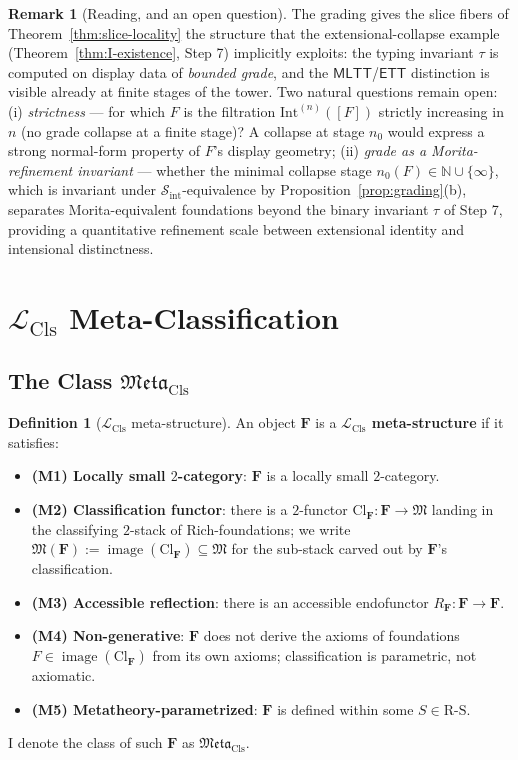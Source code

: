 \documentclass[11pt]{article}
\theoremstyle{plain}
\theoremstyle{definition}
\newtheorem{definition}[theorem]{Definition}
\newtheorem{remark}[theorem]{Remark}
\newcommand{\RS}{\mathrm{R\text{-}S}}
\newcommand{\cS}{\mathcal{S}}
\newcommand{\fM}{\mathfrak{M}}
\newcommand{\Meta}{\mathfrak{Meta}}
\newcommand{\LCls}{\mathcal{L}_{\mathrm{Cls}}}
\newcommand{\Sint}{\cS_{\mathrm{int}}}
\newcommand{\Cl}{\mathrm{Cl}}
\newcommand{\MLTT}{\mathsf{MLTT}}
\newcommand{\ETT}{\mathsf{ETT}}
\DeclareMathOperator{\image}{image}
\begin{document}
\begin{remark}[Reading, and an open question]\label{rem:grading-open}
The grading gives the slice fibers of Theorem~\ref{thm:slice-locality} the structure that the extensional-collapse example (Theorem~\ref{thm:I-existence}, Step 7) implicitly exploits: the typing invariant $\tau$ is computed on display data of \emph{bounded grade}, and the $\MLTT$/$\ETT$ distinction is visible already at finite stages of the tower. Two natural questions remain open: (i) \emph{strictness} --- for which $F$ is the filtration $\mathrm{Int}^{(n)}([F])$ strictly increasing in $n$ (no grade collapse at a finite stage)? A collapse at stage $n_0$ would express a strong normal-form property of $F$'s display geometry; (ii) \emph{grade as a Morita-refinement invariant} --- whether the minimal collapse stage $n_0(F) \in \mathbb{N} \cup \{\infty\}$, which is invariant under $\Sint$-equivalence by Proposition~\ref{prop:grading}(b), separates Morita-equivalent foundations beyond the binary invariant $\tau$ of Step 7, providing a quantitative refinement scale between extensional identity and intensional distinctness.
\end{remark}

\section{\texorpdfstring{$\LCls$ Meta-Classification}{Classifier Meta-Classification}}\label{sec:meta}

\subsection{\texorpdfstring{The Class $\Meta_{\mathrm{Cls}}$}{The Class Meta\_5+}}

\begin{definition}[$\LCls$ meta-structure]\label{def:meta}
An object $\mathbf{F}$ is a \textbf{$\LCls$ meta-structure} if it satisfies:
\begin{itemize}
\item \textbf{(M1) Locally small $2$-category}: $\mathbf{F}$ is a locally small $2$-category.
\item \textbf{(M2) Classification functor}: there is a $2$-functor $\Cl_{\mathbf{F}} : \mathbf{F} \to \fM$ landing in the classifying $2$-stack of Rich-foundations; we write $\fM(\mathbf{F}) := \image(\Cl_{\mathbf{F}}) \subseteq \fM$ for the sub-stack carved out by $\mathbf{F}$'s classification.
\item \textbf{(M3) Accessible reflection}: there is an accessible endofunctor $R_{\mathbf{F}} : \mathbf{F} \to \mathbf{F}$.
\item \textbf{(M4) Non-generative}: $\mathbf{F}$ does not derive the axioms of foundations $F \in \image(\Cl_{\mathbf{F}})$ from its own axioms; classification is parametric, not axiomatic.
\item \textbf{(M5) Metatheory-parametrized}: $\mathbf{F}$ is defined within some $S \in \RS$.
\end{itemize}
I denote the class of such $\mathbf{F}$ as $\Meta_{\mathrm{Cls}}$.
\end{definition}
\end{document}
